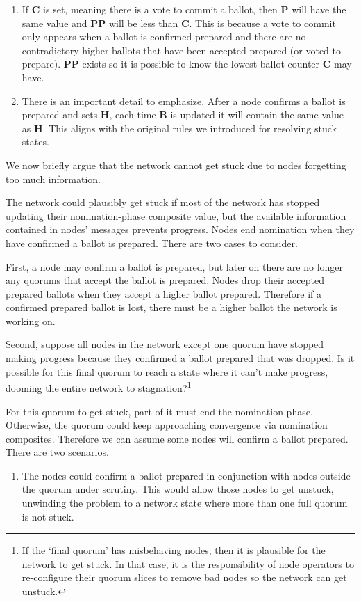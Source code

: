 \begin{enumerate}
\begin{enumerate}
        \item If \textbf{C} is set, meaning there is a vote to commit a ballot, then \textbf{P} will have the same value and \textbf{PP} will be less than \textbf{C}. This is because a vote to commit only appears when a ballot is confirmed prepared and there are no contradictory higher ballots that have been accepted prepared (or voted to prepare). \textbf{PP} exists so it is possible to know the lowest ballot counter \textbf{C} may have.

        \item There is an important detail to emphasize. After a node confirms a ballot is prepared and sets \textbf{H}, each time \textbf{B} is updated it will contain the same value as \textbf{H}. This aligns with the original rules we introduced for resolving stuck states.
    \end{enumerate}

    We now briefly argue that the network cannot get stuck due to nodes forgetting too much information.

    The network could plausibly get stuck if most of the network has stopped updating their nomination-phase composite value, but the available information contained in nodes' messages prevents progress. Nodes end nomination when they have confirmed a ballot is prepared. There are two cases to consider.

    First, a node may confirm a ballot is prepared, but later on there are no longer any quorums that accept the ballot is prepared. Nodes drop their accepted prepared ballots when they accept a higher ballot prepared. Therefore if a confirmed prepared ballot is lost, there must be a higher ballot the network is working on.

    Second, suppose all nodes in the network except one quorum have stopped making progress because they confirmed a ballot prepared that was dropped. Is it possible for this final quorum to reach a state where it can't make progress, dooming the entire network to stagnation?\footnote{If the `final quorum' has misbehaving nodes, then it is plausible for the network to get stuck. In that case, it is the responsibility of node operators to re-configure their quorum slices to remove bad nodes so the network can get unstuck.}
    
    For this quorum to get stuck, part of it must end the nomination phase. Otherwise, the quorum could keep approaching convergence via nomination composites. Therefore we can assume some nodes will confirm a ballot prepared. There are two scenarios.
    \begin{enumerate}
        \item The nodes could confirm a ballot prepared in conjunction with nodes outside the quorum under scrutiny. This would allow those nodes to get unstuck, unwinding the problem to a network state where more than one full quorum is not stuck.%


\end{enumerate}
\end{enumerate}
